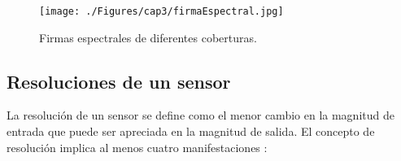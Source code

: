 \begin{figure}[H]
	\centering
	\texttt{[image: ./Figures/cap3/firmaEspectral.jpg]}
	\caption{Firmas espectrales de diferentes coberturas.}
	\label{fig:firmaEspectral}
\end{figure}

\subsection{Resoluciones de un sensor}

La resoluci\'on de un sensor se define como el menor cambio en la magnitud de entrada que puede ser apreciada en la magnitud de salida. El concepto de resoluci\'on implica al menos cuatro manifestaciones \cite{peralta2013analisis}: 
	\begin{itemize}
		

\end{itemize}
